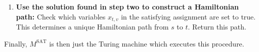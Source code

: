 \documentclass{scrartcl}
\begin{document}
\begin{solution}
\begin{enumerate}[label=(\arabic*)]
    \item \textbf{Use the solution found in step two to construct a Hamiltonian path:} Check which variables $x_{t,v}$ in the satisfying assignment are set to true. This determines a unique Hamiltonian path from $s$ to $t$. Return this path.
\end{enumerate}
Finally, $M^\text{SAT}$ is then just the Turing machine which executes this procedure. 
\end{solution}
\end{document}

